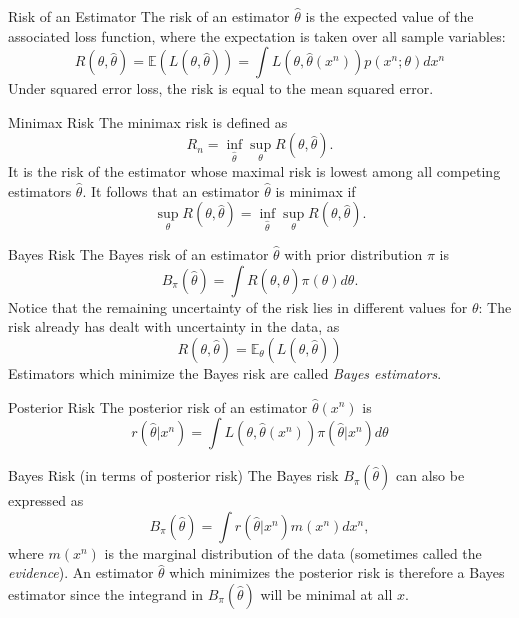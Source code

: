 \documentclass[avery5371,grid]{flashcards}
\begin{document}
\begin{flashcard}[Definition]{Risk of an Estimator}
 The risk of an estimator $\hat \theta$ is the expected value of the associated loss function,
 where the expectation is taken over all sample variables:
 \[
 R\left( \theta, \hat \theta \right) = \mathbb E \left( L\left(\theta, \hat \theta \right) \right)
 = \int L\left(\theta, \hat \theta\left(x^n\right) \right) p(x^n;\theta) dx^n
 \]
 Under squared error loss, the risk is equal to the mean squared error.
\end{flashcard}

\begin{flashcard}[Definition]{Minimax Risk}
 The minimax risk is defined as
 \[
 R_n = \inf_{\hat \theta} \sup_\theta R\left( \theta, \hat \theta \right).
 \]
It is the risk of the estimator whose maximal risk is lowest among all competing estimators
$\hat \theta$. It follows that an estimator $\hat \theta$ is minimax if 
\[
\sup_\theta R\left( \theta, \hat \theta \right) = \inf_{\hat \theta} \sup_\theta R\left( \theta, \hat \theta \right).
\]
\end{flashcard}

\begin{flashcard}[Definition]{Bayes Risk}
\scriptsize
The Bayes risk of an estimator $\hat \theta$ with prior distribution $\pi$ is
\[
B_\pi (\hat\theta) = \int R\left( \theta, \hat \theta \right) \pi\left(\theta \right) d\theta. 
\] 
Notice that the remaining uncertainty of the risk lies in different values for $\theta$: The risk already has dealt with 
uncertainty in the data, as 
\[
R\left( \theta, \hat \theta \right) = \mathbb{E}_\theta {\left( L(\theta, \hat \theta)\right)}
\]
Estimators which minimize the Bayes risk are called \textit{Bayes estimators}.
\end{flashcard}

\begin{flashcard}[Definition]{Posterior Risk}
 The posterior risk of an estimator $\hat \theta(x^n)$ is 
 \[
 r(\hat \theta | x^n) = \int L(\theta, \hat \theta(x^n)) \pi(\hat \theta | x^n) d\theta
 \]
\end{flashcard}

\begin{flashcard}[Theorem]{Bayes Risk (in terms of posterior risk)}
 The Bayes risk $B_\pi (\hat \theta)$ can also be expressed as
 \[
 B_\pi(\hat \theta) = \int  r(\hat \theta | x^n) m(x^n) dx^n,
 \]
 where $m(x^n)$ is the marginal distribution of the data (sometimes called the \textit{evidence}). An estimator
 $\hat \theta$ which minimizes the posterior risk is therefore a Bayes estimator 
 since the integrand in  $B_\pi(\hat \theta)$ will be minimal at all $x$.  
\end{flashcard}
\end{document}
